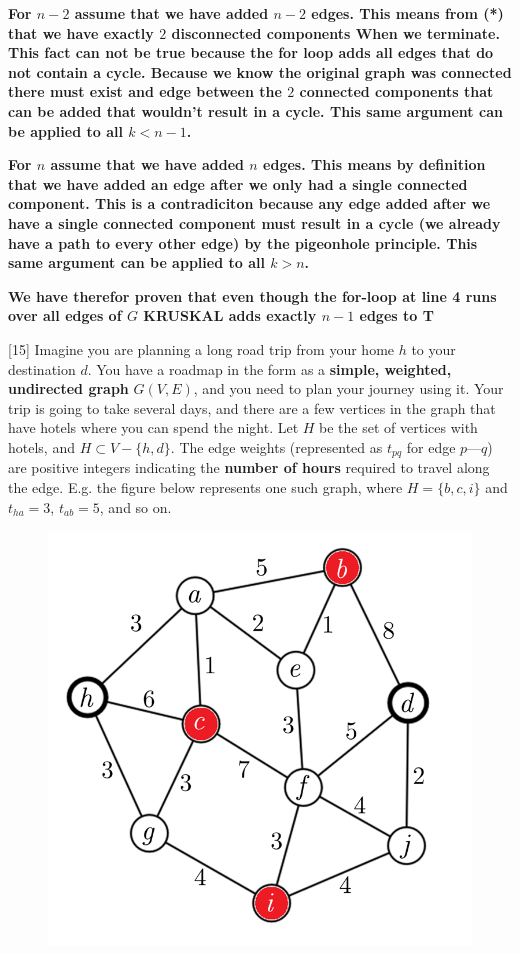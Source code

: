 \documentclass[addpoints]{exam}
\def\mysolution#1{}    %
\begin{document}
\begin{questions}
\textbf{For $n-2$ assume that we have added $n-2$ edges. This means from (*) that we have exactly $2$ disconnected components When we terminate. This fact can not be true because the for loop adds all edges that do not contain a cycle. Because we know the original graph was connected there must exist and edge between the $2$ connected components that can be added that wouldn't result in a cycle. This same argument can be applied to all $k < n-1$.} 

\textbf{For $n$ assume that we have added $n$ edges. This means by definition that we have added an edge after we only had a single connected component. This is a contradiciton because any edge added after we have a single connected component must result in a cycle (we already have a path to every other edge) by the pigeonhole principle. This same argument can be applied to all $k > n$.}

\textbf{We have therefor proven that even though the for-loop at line 4 runs over all edges of $G$ KRUSKAL adds exactly $n-1$ edges to T}

\mysolution{

}

[15]
Imagine you are planning a long road trip from your home $h$ to your destination $d$. You have a roadmap in the form as a \textbf{simple, weighted, undirected graph} $G(V,E)$, and you need to plan your journey using it. Your trip is going to take several days, and there are a few vertices in the graph that have hotels where you can spend the night. Let $H$ be the set of vertices with hotels, and $H \subset V-\{h,d\}$. The edge weights (represented as $t_{pq}$ for edge $p$---$q$) are positive integers indicating the \textbf{number of hours} required to travel along the edge. E.g. the figure below represents one such graph, where $H=\{b,c,i\}$ and $t_{ha}=3$, $t_{ab}=5$, and so on.

\begin{figure}[h!]
    \centering
    \includegraphics[width=0.35\linewidth]{hotels.png}
\end{figure}


\end{questions}
\end{document}

